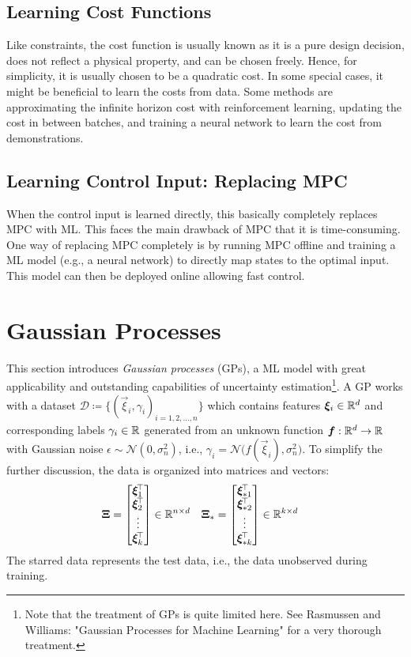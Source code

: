 		\subsection{Learning Cost Functions}
			Like constraints, the cost function is usually known as it is a pure design decision, does not reflect a physical property, and can be chosen freely. Hence, for simplicity, it is usually chosen to be a quadratic cost. In some special cases, it might be beneficial to learn the costs from data. Some methods are approximating the infinite horizon cost with reinforcement learning, updating the cost in between batches, and training a neural network to learn the cost from demonstrations.

		\subsection{Learning Control Input: Replacing MPC}
			When the control input is learned directly, this basically completely replaces MPC with ML. This faces the main drawback of MPC that it is time-consuming. One way of replacing MPC completely is by running MPC offline and training a ML model (e.g., a neural network) to directly map states to the optimal input. This model can then be deployed online allowing fast control.

	\section{Gaussian Processes}
		This section introduces \emph{Gaussian processes} (GPs), a ML model with great applicability and outstanding capabilities of uncertainty estimation\footnote{Note that the treatment of GPs is quite limited here. See Rasmussen and Williams: "Gaussian Processes for Machine Learning" for a very thorough treatment.}. A GP works with a dataset \( \mathcal{D} \coloneqq \{ (\vec{\xi}_i, \gamma_i)_{i = 1, 2, \dots, n} \} \) which contains features \(\bm{\xi}_i \in \mathbb{R}^d\) and corresponding labels \(\gamma_i \in \mathbb{R}\) generated from an unknown function \( \bm{f} : \mathbb{R}^d \to \mathbb{R} \) with Gaussian noise \( \epsilon \sim \mathcal{N}(0, \sigma_n^2) \), i.e., \( \gamma_i = \mathcal{N}\bigl(f(\vec{\xi}_i), \sigma_n^2\bigr) \). To simplify the further discussion, the data is organized into matrices and vectors:
		\begin{align}
			\bm{\mathrm{\Xi}} &= \begin{bmatrix} \bm{\xi}_1^{\!\top} \\ \bm{\xi}_2^{\!\top} \\ \vdots \\ \bm{\xi}_k^{\!\top} \end{bmatrix} \in \mathbb{R}^{n \times d} &
			\bm{\mathrm{\Xi}}_\ast &= \begin{bmatrix} \bm{\xi}_{\ast 1}^{\!\top} \\ \bm{\xi}_{\ast 2}^{\!\top} \\ \vdots \\ \bm{\xi}_{\ast k}^{\!\top} \end{bmatrix} \in \mathbb{R}^{k \times d}
		\end{align}
		The starred data represents the test data, i.e., the data unobserved during training.

